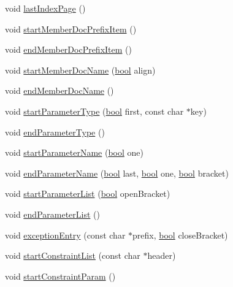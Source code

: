\begin{DoxyCompactItemize}
void \hyperlink{class_output_list_a9edb8dc61594b5f30bb7f4b004b04f41}{last\+Index\+Page} ()
\item 
void \hyperlink{class_output_list_acc616cc002e406c1c5816f020fb7d60c}{start\+Member\+Doc\+Prefix\+Item} ()
\item 
void \hyperlink{class_output_list_a7119d284c2d0a7d635d103969d9e628e}{end\+Member\+Doc\+Prefix\+Item} ()
\item 
void \hyperlink{class_output_list_a0b9d56f0ab609c25ba0b449e4d977f80}{start\+Member\+Doc\+Name} (\hyperlink{qglobal_8h_a1062901a7428fdd9c7f180f5e01ea056}{bool} align)
\item 
void \hyperlink{class_output_list_a1c30d8717346992a8a9c35f2ae92271f}{end\+Member\+Doc\+Name} ()
\item 
void \hyperlink{class_output_list_ae4db40bcc0a1ca523bff4648727c0c0e}{start\+Parameter\+Type} (\hyperlink{qglobal_8h_a1062901a7428fdd9c7f180f5e01ea056}{bool} first, const char $\ast$key)
\item 
void \hyperlink{class_output_list_acb73d83bd4b05b5041de62a7336747e5}{end\+Parameter\+Type} ()
\item 
void \hyperlink{class_output_list_acde2fcc0d42034b7f342d12119957a81}{start\+Parameter\+Name} (\hyperlink{qglobal_8h_a1062901a7428fdd9c7f180f5e01ea056}{bool} one)
\item 
void \hyperlink{class_output_list_a099948218dcd590cd91752e318a40c0a}{end\+Parameter\+Name} (\hyperlink{qglobal_8h_a1062901a7428fdd9c7f180f5e01ea056}{bool} last, \hyperlink{qglobal_8h_a1062901a7428fdd9c7f180f5e01ea056}{bool} one, \hyperlink{qglobal_8h_a1062901a7428fdd9c7f180f5e01ea056}{bool} bracket)
\item 
void \hyperlink{class_output_list_a297f991eafa9e368a982c936891bb79e}{start\+Parameter\+List} (\hyperlink{qglobal_8h_a1062901a7428fdd9c7f180f5e01ea056}{bool} open\+Bracket)
\item 
void \hyperlink{class_output_list_ab7c1be88384dc59f5ca11f8da2113a4d}{end\+Parameter\+List} ()
\item 
void \hyperlink{class_output_list_ae1a20725b9e3a82aeb7b3024c040a2f9}{exception\+Entry} (const char $\ast$prefix, \hyperlink{qglobal_8h_a1062901a7428fdd9c7f180f5e01ea056}{bool} close\+Bracket)
\item 
void \hyperlink{class_output_list_a575e4c75ffabab1820d045ba7e6a15e9}{start\+Constraint\+List} (const char $\ast$header)
\item 
void \hyperlink{class_output_list_a552198c8c605b7d5bc9cb49885e5cf87}{start\+Constraint\+Param} ()
\item 

\end{DoxyCompactItemize}
